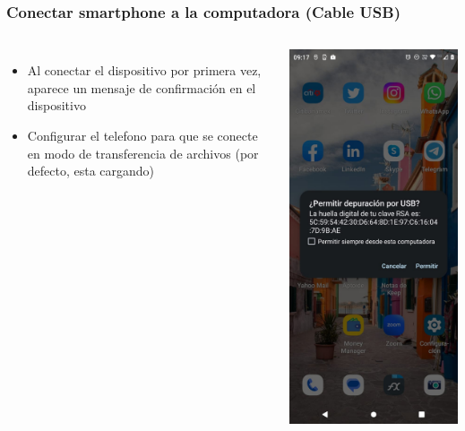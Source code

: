 \begin{frame}
\frametitle{Conectar smartphone a la computadora (Cable USB)}  
\begin{columns}
\begin{itemize}
\item Al conectar el dispositivo por primera vez, aparece un mensaje de confirmaci\'on en el dispositivo
\item Configurar el telefono para que se conecte en modo de transferencia de archivos (por defecto, esta cargando)
\end{itemize}

\begin{center}
\includegraphics[width=0.95\linewidth]{01_Configurar/HabilitarDepuracionUSB2.jpg}    

\end{center}
\end{columns}
\end{frame}
